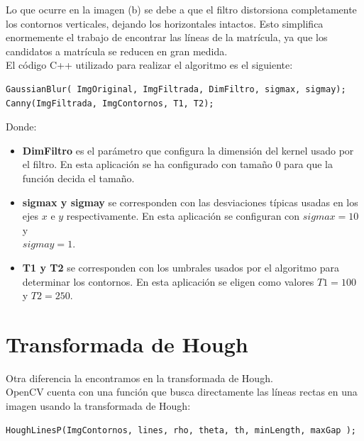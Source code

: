 Lo que ocurre en la imagen (b) se debe a que el filtro distorsiona completamente los contornos verticales, dejando los horizontales intactos. Esto simplifica enormemente el trabajo de encontrar las líneas de la matrícula, ya que los candidatos a matrícula se reducen en gran medida.\\

El código C++ utilizado para realizar el algoritmo es el siguiente:

\begin{lstlisting}
GaussianBlur( ImgOriginal, ImgFiltrada, DimFiltro, sigmax, sigmay);
Canny(ImgFiltrada, ImgContornos, T1, T2);
\end{lstlisting}

Donde:
\begin{itemize}
\item \textbf{DimFiltro} es el parámetro que configura la dimensión del kernel usado por el filtro. En esta aplicación se ha configurado con tamaño 0 para que la función decida el tamaño.
\item \textbf{sigmax y sigmay} se corresponden con las desviaciones típicas usadas en los ejes $x$ e $y$ respectivamente. En esta aplicación se configuran con $sigmax=10$ y \\$ sigmay=1$.
\item\textbf {T1 y T2} se corresponden con los umbrales usados por el algoritmo para determinar los contornos. En esta aplicación se eligen como valores $T1=100$ y $T2=250$.
\end{itemize}

\section{Transformada de Hough}\label{CannyCV}
Otra diferencia la encontramos en la transformada de Hough.\\

OpenCV cuenta con una función que busca directamente las líneas rectas en una imagen usando la transformada de Hough:


\begin{lstlisting}
HoughLinesP(ImgContornos, lines, rho, theta, th, minLength, maxGap );
\end{lstlisting}

